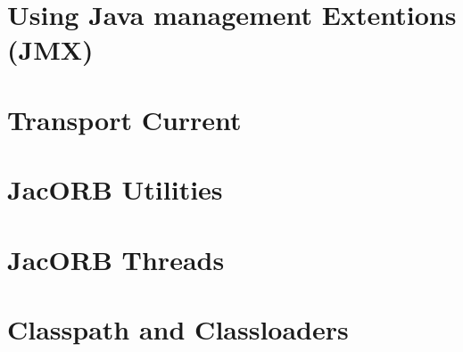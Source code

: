 \documentclass[12pt]{scrbook}
\begin{document}
\chapter{Using Java management Extentions (JMX)}
\label{ch:jmx}






\chapter{Transport Current}
\label{ch:transportcurrent}






\chapter{JacORB Utilities}
\label{ch:tools}





\chapter{JacORB Threads}
\label{ch:threads}






\chapter{Classpath and Classloaders}
\label{ch:classloader}





{


}
\end{document}
